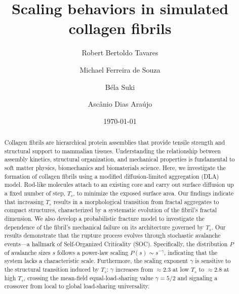 \documentclass[aps,physrev,preprint,groupedaddress,linenumbers]{revtex4-2}
\begin{document}

\title{\textbf{Scaling behaviors in simulated collagen fibrils}}

\author{Robert Bertoldo Tavares}

\author{Michael Ferreira de Souza}

\author{B\'ela Suki}

\author{Ascânio Dias Araújo}


\date{\today}

\begin{abstract}
Collagen fibrils are hierarchical protein assemblies that provide tensile strength and structural support to mammalian tissues. Understanding the relationship between assembly kinetics, structural organization, and mechanical properties is fundamental to soft matter physics, biomechanics and biomaterials science. Here, we investigate the formation of collagen fibrils using a modified diffusion-limited aggregation (DLA) model. Rod-like molecules attach to an existing core and carry out surface diffusion up a fixed number of step, $T_s$, to minimize the exposed surface area. Our findings indicate that increasing $T_{s}$  results in a morphological transition from fractal aggregates to compact structures, characterized by a systematic evolution of the fibril's fractal dimension. We also develop a probabilistic fracture model to investigate the dependence of the fibril's mechanical failure on its architecture governed by $T_s$. Our results demonstrate that the rupture process evolves through stochastic avalanche events—a hallmark of Self-Organized Criticality (SOC). Specifically, the distribution $P$ of avalanche sizes $s$ follows a power-law scaling $P(s)\sim s^{-\gamma}$, indicating that the system lacks a characteristic scale. Furthermore, the scaling exponent $\gamma$ is sensitive to the structural transition induced by $T_{s}$: $\gamma$ increases from $\approx 2.3$ at low $T_s$ to $\approx 2.8$ at high $T_s$, crossing the mean-field equal-load-sharing value $\gamma=5/2$ and signaling a crossover from local to global load-sharing universality.
\end{abstract}
\end{document}
